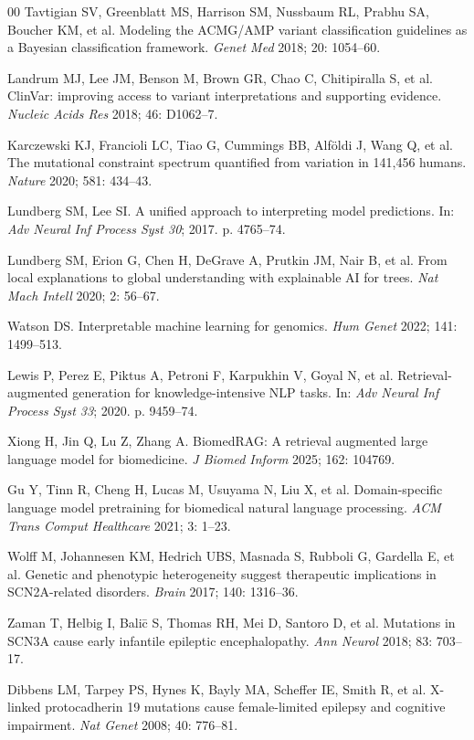 \documentclass[12pt,a4paper]{article}
\begin{document}
\begin{thebibliography}{00}
Tavtigian SV, Greenblatt MS, Harrison SM, Nussbaum RL, Prabhu SA,
Boucher KM, et al. Modeling the ACMG/AMP variant classification
guidelines as a Bayesian classification framework.
\textit{Genet Med} 2018; 20: 1054--60.

Landrum MJ, Lee JM, Benson M, Brown GR, Chao C, Chitipiralla S, et al.
ClinVar: improving access to variant interpretations and supporting
evidence.
\textit{Nucleic Acids Res} 2018; 46: D1062--7.

Karczewski KJ, Francioli LC, Tiao G, Cummings BB, Alföldi J, Wang Q,
et al. The mutational constraint spectrum quantified from variation in
141,456 humans.
\textit{Nature} 2020; 581: 434--43.

Lundberg SM, Lee SI. A unified approach to interpreting model predictions.
In: \textit{Adv Neural Inf Process Syst 30}; 2017. p. 4765--74.

Lundberg SM, Erion G, Chen H, DeGrave A, Prutkin JM, Nair B, et al.
From local explanations to global understanding with explainable AI for
trees.
\textit{Nat Mach Intell} 2020; 2: 56--67.

Watson DS. Interpretable machine learning for genomics.
\textit{Hum Genet} 2022; 141: 1499--513.

Lewis P, Perez E, Piktus A, Petroni F, Karpukhin V, Goyal N, et al.
Retrieval-augmented generation for knowledge-intensive NLP tasks. In:
\textit{Adv Neural Inf Process Syst 33}; 2020. p. 9459--74.

Xiong H, Jin Q, Lu Z, Zhang A. BiomedRAG: A retrieval augmented large
language model for biomedicine.
\textit{J Biomed Inform} 2025; 162: 104769.

Gu Y, Tinn R, Cheng H, Lucas M, Usuyama N, Liu X, et al.
Domain-specific language model pretraining for biomedical natural
language processing.
\textit{ACM Trans Comput Healthcare} 2021; 3: 1--23.

Wolff M, Johannesen KM, Hedrich UBS, Masnada S, Rubboli G,
Gardella E, et al. Genetic and phenotypic heterogeneity suggest
therapeutic implications in SCN2A-related disorders.
\textit{Brain} 2017; 140: 1316--36.

Zaman T, Helbig I, Bali\={c} S, Thomas RH, Mei D, Santoro D, et al.
Mutations in SCN3A cause early infantile epileptic encephalopathy.
\textit{Ann Neurol} 2018; 83: 703--17.

Dibbens LM, Tarpey PS, Hynes K, Bayly MA, Scheffer IE, Smith R, et al.
X-linked protocadherin 19 mutations cause female-limited epilepsy and
cognitive impairment.
\textit{Nat Genet} 2008; 40: 776--81.

\end{thebibliography}
\end{document}
